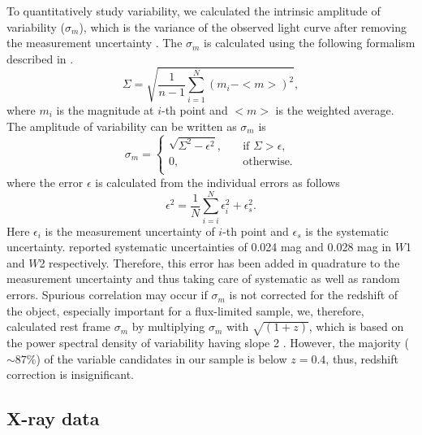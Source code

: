 To quantitatively study variability, we calculated the intrinsic 
amplitude of variability ($\sigma_m$), which is the variance of the observed light curve after removing the measurement uncertainty \citep[see also][]{2017ApJ...842...96R}. The $\sigma_m$ is calculated using the following formalism described in \citet{2007AJ....134.2236S}.
\begin{equation}
\Sigma=\sqrt{\frac{1}{n-1}\sum_{i=1}^{N}(m_i - <m>)^2},
\end{equation}
where $m_i$ is the magnitude at $i$-th point and $<m>$ is the weighted average.
The amplitude of variability  can be written as  
$\sigma_m$ is             
\[\sigma_m  =
  \begin{cases}
    \sqrt{\Sigma^2 - \epsilon^2},  & \quad \text{if } \Sigma>\epsilon,\\
     0,                            & \quad  \text{otherwise.}\\
  \end{cases}
\]	               
where the error $\epsilon$ is calculated from the individual errors as follows
\begin{equation}
\epsilon^2=\frac{1}{N}\sum_{i=i}^{N}{\epsilon_{i}^{2} + \epsilon_{s}^2}. 
\end{equation}
Here $\epsilon_{i}$ is the measurement uncertainty of $i$-th point and $\epsilon_{s}$ is the systematic uncertainty. \citet{2011ApJ...735..112J} reported systematic uncertainties of 0.024 mag and 0.028 mag in $W$1 and $W$2 respectively. Therefore, this error has been added in quadrature to the measurement uncertainty and thus taking care of systematic as well as random errors. Spurious correlation may occur if $\sigma_m$ is not corrected for the redshift of the object, especially important for a flux-limited sample, we, therefore, calculated rest frame $\sigma_m$ by multiplying $\sigma_m$ with $\sqrt{(1+z)}$, which is based on the power spectral
density of variability having slope 2 \citep[see][]{2009ApJ...698..895K}. However, the majority ($\sim 87\%$) of the variable candidates in our sample is below $z=0.4$, thus, redshift correction is insignificant.















\subsection{X-ray data}
